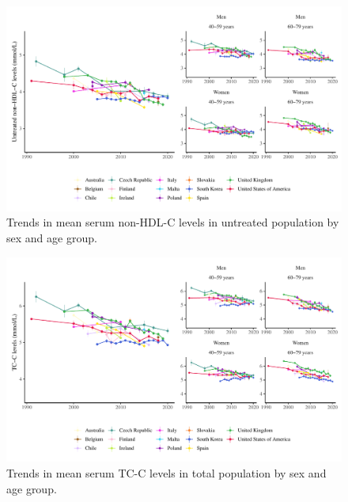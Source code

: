 \documentclass[12pt]{article}
\begin{document}
\begin{appendix}
\begin{refsection}
\begin{landscape}
        \begin{figure}[H]
            \centering
            \includegraphics[width=\linewidth]{../3_figures/nonhdl_untreated.pdf}
            \caption{Trends in mean serum non-HDL-C levels in untreated population by sex and age group.}
            \label{fig:nonhdl_untreated}
        \end{figure}

        \begin{figure}[H]
            \centering
            \includegraphics[width=\linewidth]{../3_figures/tc.pdf}
            \caption{Trends in mean serum TC-C levels in total population by sex and age group.}
            \label{fig:tc}
        \end{figure}


\end{landscape}
\end{refsection}
\end{appendix}
\end{document}
